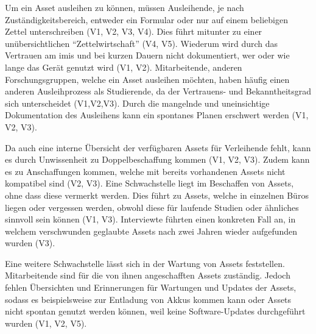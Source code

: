 Um ein Asset ausleihen zu können, müssen Ausleihende, je nach
Zuständigkeitsbereich, entweder ein Formular oder nur auf einem beliebigen
Zettel unterschreiben (V1, V2, V3, V4). Dies führt mitunter zu einer
unübersichtlichen \enquote{Zettelwirtschaft} (V4, V5). Wiederum wird durch das
Vertrauen am \ac{imis} und bei kurzen Dauern nicht dokumentiert, wer oder wie
lange das Gerät genutzt wird (V1, V2). Mitarbeitende, anderen
Forschungsgruppen, welche ein Asset ausleihen möchten, haben häufig einen anderen
Ausleihprozess als Studierende, da der Vertrauens- und Bekanntheitsgrad sich
unterscheidet (V1,V2,V3). Durch die mangelnde und uneinsichtige Dokumentation
des Ausleihens kann ein spontanes Planen erschwert werden (V1, V2, V3).

Da auch eine interne Übersicht der verfügbaren Assets für Verleihende fehlt,
kann es durch Unwissenheit zu Doppelbeschaffung kommen (V1, V2, V3). Zudem
kann es zu Anschaffungen kommen, welche mit bereits vorhandenen Assets nicht
kompatibel sind (V2, V3). Eine Schwachstelle liegt im Beschaffen von Assets,
ohne dass diese vermerkt werden. Dies führt zu Assets, welche in einzelnen Büros
liegen oder vergessen werden, obwohl diese für laufende Studien oder ähnliches
sinnvoll sein können (V1, V3). Interviewte führten einen konkreten Fall an, in
welchem verschwunden geglaubte Assets nach zwei Jahren wieder aufgefunden wurden
(V3).

Eine weitere Schwachstelle lässt sich in der Wartung von Assets feststellen.
Mitarbeitende sind für die von ihnen angeschafften Assets zuständig. Jedoch
fehlen Übersichten und Erinnerungen für Wartungen und Updates der Assets, sodass
es beispielsweise zur Entladung von Akkus kommen kann oder Assets nicht spontan
genutzt werden können, weil keine Software-Updates durchgeführt wurden (V1, V2,
V5).

